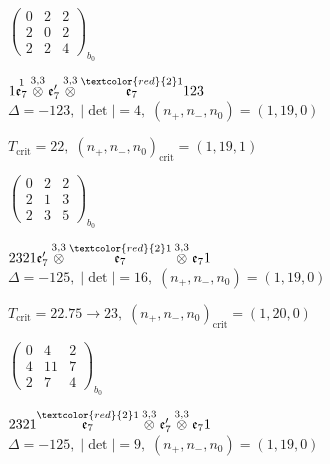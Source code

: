 \documentclass[10pt]{article}
\begin{document}
\hspace{2em}$\left(\begin{smallmatrix}0 & 2 & 2 \\ 2 & 0 & 2 \\ 2 & 2 & 4\end{smallmatrix}\right)_{\!b_0}$

\smallskip

$1\overset{1}{\mathfrak{e}_7}\overset{3,3}{\otimes}\mathfrak{e}_7'\overset{3,3}{\otimes}\overset{\textcolor{red}{2}1}{\mathfrak{e}_7}123$ \quad $\Delta=-123,\; |\det|=4,\; (n_+,n_-,n_0)=(1,19,0)$

\hspace{1em}$T_{\text{crit}}=22,\; (n_+,n_-,n_0)_{\text{crit}}=(1,19,1)$

\hspace{2em}$\left(\begin{smallmatrix}0 & 2 & 2 \\ 2 & 1 & 3 \\ 2 & 3 & 5\end{smallmatrix}\right)_{\!b_0}$

\smallskip

$2321\mathfrak{e}_7'\overset{3,3}{\otimes}\overset{\textcolor{red}{2}1}{\mathfrak{e}_7}\overset{3,3}{\otimes}\mathfrak{e}_71$ \quad $\Delta=-125,\; |\det|=16,\; (n_+,n_-,n_0)=(1,19,0)$

\hspace{1em}$T_{\text{crit}}=22.75 \to 23,\; (n_+,n_-,n_0)_{\text{crit}}=(1,20,0)$

\hspace{2em}$\left(\begin{smallmatrix}0 & 4 & 2 \\ 4 & 11 & 7 \\ 2 & 7 & 4\end{smallmatrix}\right)_{\!b_0}$

\smallskip

$2321\overset{\textcolor{red}{2}1}{\mathfrak{e}_7}\overset{3,3}{\otimes}\mathfrak{e}_7'\overset{3,3}{\otimes}\mathfrak{e}_71$ \quad $\Delta=-125,\; |\det|=9,\; (n_+,n_-,n_0)=(1,19,0)$
\end{document}
